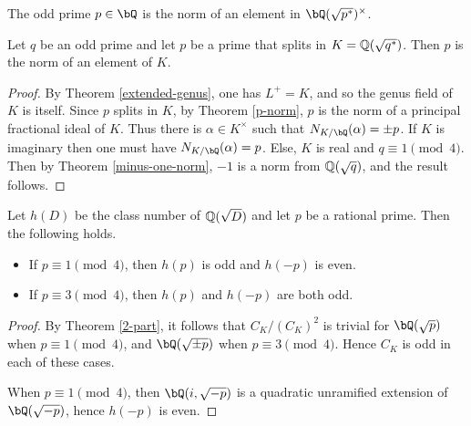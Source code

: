 \begin{cor}\label{p-norm}
The odd prime $p \in \bQ$ is the norm of an element in $\bQ(\sqrt{p^*})^{\times}$.
\end{cor}

\begin{cor}\label{cor_psplit_pnorm}
    Let $q$ be an odd prime and let $p$ be a prime that splits in $K = \mathbb{Q}(\sqrt{q^*})$. Then $p$ is the norm of an element of $K$. 
\end{cor}
\begin{proof}
    By Theorem \ref{extended-genus}, one has $L^{+} = K$, and so the genus field of $K$ is itself. Since $p$ splits in $K$, by Theorem \ref{p-norm}, $p$ is the norm of a principal fractional ideal of $K$. Thus there is $\alpha \in K^{\times}$ such that $N_{K / \bQ}(\alpha) = \pm p$.
    If $K$ is imaginary then one must have $N_{K / \bQ}(\alpha) = p$. Else, $K$ is real and $q \equiv 1 \pmod 4$. Then by Theorem \ref{minus-one-norm}, $-1$ is a norm from $\mathbb{Q}(\sqrt{q})$, and the result follows.
\end{proof}

\begin{thm}\label{thm_class_number}
    Let $h(D)$ be the class number of $\mathbb{Q}(\sqrt{D})$ and let $p$ be a rational prime. Then the following holds.
    \begin{itemize}
        \item If $p\equiv1\pmod{4}$, then $h(p)$ is odd and $h(-p)$ is even.
        \item If $p\equiv3\pmod{4}$, then $h(p)$ and $h(-p)$ are both odd.
    \end{itemize}
\end{thm}

\begin{proof}
By Theorem \ref{2-part}, it follows that $C_K / (C_K)^2$ is trivial for $\bQ(\sqrt{p})$ when $p \equiv 1 \pmod 4$, and $\bQ(\sqrt{ \pm p})$ when $p \equiv 3 \pmod 4$. Hence $C_K$ is odd in each of these cases. 

When $p \equiv 1 \pmod 4$, then $\bQ(i, \sqrt{-p})$ is a quadratic unramified extension of $\bQ(\sqrt{-p})$, hence $h(-p)$ is even.
\end{proof}

